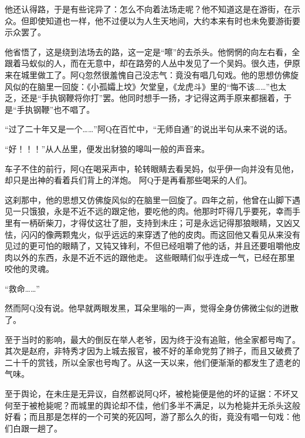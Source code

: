 \documentclass[12pt,UTF8]{ctexbook}
\begin{document}
他还认得路，于是有些诧异了：怎么不向着法场走呢？他不知道这是在游街，在示众。但即使知道也一样，他不过便以为人生天地间，大约本来有时也未免要游街要示众罢了。

他省悟了，这是绕到法场去的路，这一定是“嚓”的去杀头。他惘惘的向左右看，全跟着马蚁似的人，而在无意中，却在路旁的人丛中发见了一个吴妈。很久违，伊原来在城里做工了。阿Q忽然很羞愧自己没志气：竟没有唱几句戏。他的思想仿佛旋风似的在脑里一回旋：《小孤孀上坟》欠堂皇，《龙虎斗》里的“悔不该……”也太乏，还是“手执钢鞭将你打”罢。他同时想手一扬，才记得这两手原来都捆着，于是“手执钢鞭”也不唱了。

“过了二十年又是一个……”阿Q在百忙中，“无师自通”的说出半句从来不说的话。

“好！！！”从人丛里，便发出豺狼的嗥叫一般的声音来。

车子不住的前行，阿Q在喝采声中，轮转眼睛去看吴妈，似乎伊一向并没有见他，却只是出神的看着兵们背上的洋炮。
阿Q于是再看那些喝采的人们。

这刹那中，他的思想又仿佛旋风似的在脑里一回旋了。四年之前，他曾在山脚下遇见一只饿狼，永是不近不远的跟定他，要吃他的肉。他那时吓得几乎要死，幸而手里有一柄斫柴刀，才得仗这壮了胆，支持到未庄；可是永远记得那狼眼睛，又凶又怯，闪闪的像两颗鬼火，似乎远远的来穿透了他的皮肉。而这回他又看见从来没有见过的更可怕的眼睛了，又钝又锋利，不但已经咀嚼了他的话，并且还要咀嚼他皮肉以外的东西，永是不近不远的跟他走。
这些眼睛们似乎连成一气，已经在那里咬他的灵魂。

“救命……”

然而阿Q没有说。他早就两眼发黑，耳朵里嗡的一声，觉得全身仿佛微尘似的迸散了。

至于当时的影响，最大的倒反在举人老爷，因为终于没有追赃，他全家都号啕了。其次是赵府，非特秀才因为上城去报官，被不好的革命党剪了辫子，而且又破费了二十千的赏钱，所以全家也号啕了。从这一天以来，他们便渐渐的都发生了遗老的气味。

至于舆论，在未庄是无异议，自然都说阿Q坏，被枪毙便是他的坏的证据：不坏又何至于被枪毙呢？而城里的舆论却不佳，他们多半不满足，以为枪毙并无杀头这般好看；而且那是怎样的一个可笑的死囚呵，游了那么久的街，竟没有唱一句戏：他们白跟一趟了。
\end{document}
